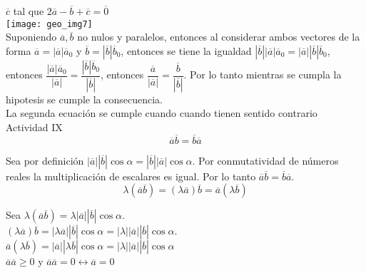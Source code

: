 \documentclass[11pt,a4paper]{article}
\begin{document}
\begin{justify}
\noindent
$\overline{c}$ tal que $2\overline{a}-\overline{b}+\overline{c} = \overline{0}$\\
\texttt{[image: geo\_img7]}\\

\noindent
\noindent
Suponiendo $\overline{a}, \overline{b}$ no nulos y paralelos, entonces al considerar ambos vectores de la forma $\overline{a} = |\overline{a}|\overline{a}_0$ y $\overline{b} = |\overline{b}|\overline{b}_0$, entonces se tiene la igualdad $|\overline{b}||\overline{a}|\overline{a}_0 = |\overline{a}||\overline{b}|\overline{b}_0$, entonces $\dfrac{|\overline{a}|\overline{a}_0}{|\overline{a}|} = \dfrac{|\overline{b}|\overline{b}_0}{|\overline{b}|}$, entonces $\dfrac{\overline{a}}{|\overline{a}|} =\dfrac{\overline{b}}{|\overline{b}|}$. Por lo tanto mientras se cumpla la hipotesis se cumple la consecuencia.\\

\noindent
La segunda ecuación se cumple cuando cuando tienen sentido contrario\\

\noindent
Actividad IX\\

\noindent
$$ \overline{a}\overline{b} = \overline{b}\overline{a} $$

Sea por definición $|\overline{a}||\overline{b}| \cos \alpha = |\overline{b}||\overline{a}| \cos \alpha$. Por conmutatividad de números reales la multiplicación de escalares es igual. Por lo tanto $ \overline{a}\overline{b} = \overline{b}\overline{a} $.\\

$$ \lambda (\overline{a}\overline{b}) = (\lambda \overline{a})\overline{b} = \overline{a}(\lambda \overline{b}) $$


\noindent
Sea $\lambda (\overline{a}\overline{b}) = \lambda |\overline{a}||\overline{b}|\cos \alpha$.\\

\noindent
$(\lambda \overline{a})\overline{b} = |\lambda \overline{a}||\overline{b}| \cos \alpha = |\lambda || \overline{a}||\overline{b}| \cos \alpha$.\\

\noindent
$ \overline{a}(\lambda \overline{b}) = |\overline{a}||\lambda \overline{b}| \cos \alpha =|\lambda| |\overline{a}| |\overline{b}| \cos \alpha $\\

\noindent
$\overline{a}\overline{a} \geq 0 $ y $\overline{a}\overline{a} = 0 \leftrightarrow \overline{a} = 0$\\


\end{justify}
\end{document}
